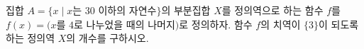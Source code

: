 집합 $A=\{x \mid x$는 $30$ 이하의 자연수$\}$의 부분집합 $X$를 정의역으로 하는 함수 $f$를 $f(x)=(x$를 $4$로 나누었을 때의 나머지$)$로 정의하자. 함수 $f$의 치역이 $\{3\}$이 되도록 하는 정의역 $X$의 개수를 구하시오.
